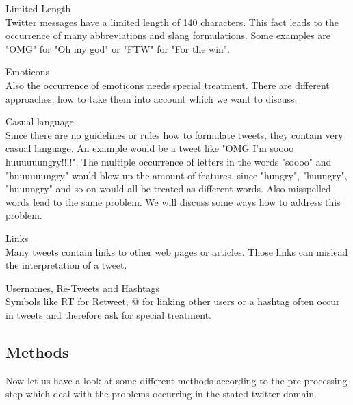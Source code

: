 \documentclass{sig-alternate}
\begin{document}
\begin{itemize}
\begin{item}
Limited Length\\
Twitter messages have a limited length of 140 characters. This fact leads to the occurrence of many abbreviations and slang formulations. Some examples are "OMG" for "Oh my god" or "FTW" for "For the win".
\end{item}


\begin{item}
Emoticons\\
Also the occurrence of emoticons needs special treatment. There are different approaches, how to take them into account which we want to discuss.
\end{item}

\begin{item}
Casual language\\
Since there are no guidelines or rules how to formulate tweets, they contain very casual language. An example would be a tweet like "OMG I'm soooo huuuuuungry!!!!". The multiple occurrence of letters in the words "soooo" and "huuuuuungry" would blow up the amount of features, since "hungry", "huungry", "huuungry" and so on would all be treated as different words. Also misspelled words lead to the same problem. We will discuss some ways how to address this problem.
\end{item}

\begin{item}
Links\\
Many tweets contain links to other web pages or articles. Those links can mislead the interpretation of a tweet.
\end{item}

\begin{item}
Usernames, Re-Tweets and Hashtags\\
Symbols like RT for Retweet, @ for linking other users or a hashtag often occur in tweets and therefore ask for special treatment.
\end{item}
\end{itemize}

\subsection{Methods}
Now let us have a look at some different methods according to the pre-processing step which deal with the problems occurring in the stated twitter domain.
\end{document}
